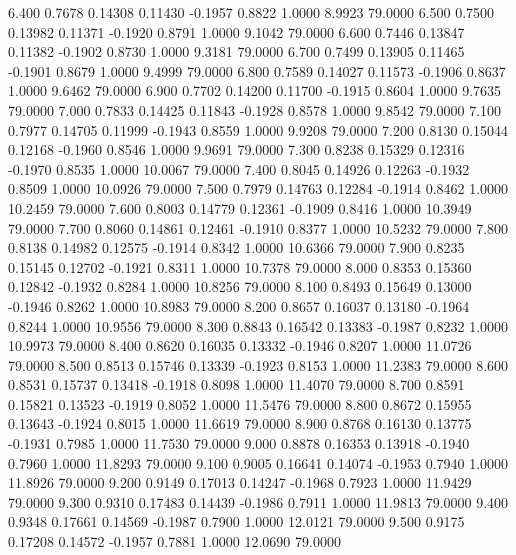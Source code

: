    6.400   0.7678   0.14308   0.11430  -0.1957   0.8822   1.0000   8.9923  79.0000
   6.500   0.7500   0.13982   0.11371  -0.1920   0.8791   1.0000   9.1042  79.0000
   6.600   0.7446   0.13847   0.11382  -0.1902   0.8730   1.0000   9.3181  79.0000
   6.700   0.7499   0.13905   0.11465  -0.1901   0.8679   1.0000   9.4999  79.0000
   6.800   0.7589   0.14027   0.11573  -0.1906   0.8637   1.0000   9.6462  79.0000
   6.900   0.7702   0.14200   0.11700  -0.1915   0.8604   1.0000   9.7635  79.0000
   7.000   0.7833   0.14425   0.11843  -0.1928   0.8578   1.0000   9.8542  79.0000
   7.100   0.7977   0.14705   0.11999  -0.1943   0.8559   1.0000   9.9208  79.0000
   7.200   0.8130   0.15044   0.12168  -0.1960   0.8546   1.0000   9.9691  79.0000
   7.300   0.8238   0.15329   0.12316  -0.1970   0.8535   1.0000  10.0067  79.0000
   7.400   0.8045   0.14926   0.12263  -0.1932   0.8509   1.0000  10.0926  79.0000
   7.500   0.7979   0.14763   0.12284  -0.1914   0.8462   1.0000  10.2459  79.0000
   7.600   0.8003   0.14779   0.12361  -0.1909   0.8416   1.0000  10.3949  79.0000
   7.700   0.8060   0.14861   0.12461  -0.1910   0.8377   1.0000  10.5232  79.0000
   7.800   0.8138   0.14982   0.12575  -0.1914   0.8342   1.0000  10.6366  79.0000
   7.900   0.8235   0.15145   0.12702  -0.1921   0.8311   1.0000  10.7378  79.0000
   8.000   0.8353   0.15360   0.12842  -0.1932   0.8284   1.0000  10.8256  79.0000
   8.100   0.8493   0.15649   0.13000  -0.1946   0.8262   1.0000  10.8983  79.0000
   8.200   0.8657   0.16037   0.13180  -0.1964   0.8244   1.0000  10.9556  79.0000
   8.300   0.8843   0.16542   0.13383  -0.1987   0.8232   1.0000  10.9973  79.0000
   8.400   0.8620   0.16035   0.13332  -0.1946   0.8207   1.0000  11.0726  79.0000
   8.500   0.8513   0.15746   0.13339  -0.1923   0.8153   1.0000  11.2383  79.0000
   8.600   0.8531   0.15737   0.13418  -0.1918   0.8098   1.0000  11.4070  79.0000
   8.700   0.8591   0.15821   0.13523  -0.1919   0.8052   1.0000  11.5476  79.0000
   8.800   0.8672   0.15955   0.13643  -0.1924   0.8015   1.0000  11.6619  79.0000
   8.900   0.8768   0.16130   0.13775  -0.1931   0.7985   1.0000  11.7530  79.0000
   9.000   0.8878   0.16353   0.13918  -0.1940   0.7960   1.0000  11.8293  79.0000
   9.100   0.9005   0.16641   0.14074  -0.1953   0.7940   1.0000  11.8926  79.0000
   9.200   0.9149   0.17013   0.14247  -0.1968   0.7923   1.0000  11.9429  79.0000
   9.300   0.9310   0.17483   0.14439  -0.1986   0.7911   1.0000  11.9813  79.0000
   9.400   0.9348   0.17661   0.14569  -0.1987   0.7900   1.0000  12.0121  79.0000
   9.500   0.9175   0.17208   0.14572  -0.1957   0.7881   1.0000  12.0690  79.0000
